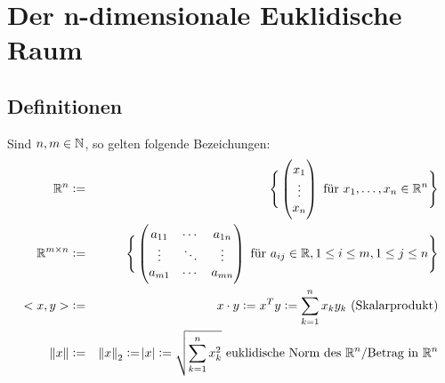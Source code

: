 \section{Der n-dimensionale Euklidische Raum}

\subsection{Definitionen}
Sind $n, m \in \mathbb{N}$, so gelten folgende Bezeichungen:
\begin{eqnarray*}
    \mathbb{R}^n &:=& \Bigg\{
        \begin{pmatrix}
            x_1\\
            \vdots \\
            x_n
        \end{pmatrix}
        \text{ für }
        x_1, \ldots, x_n \in \mathbb{R}^n
    \Bigg\} \\
    \mathbb{R}^{m \times n} &:=& \Bigg\{
        \begin{pmatrix}
            a_{11} & \cdots & a_{1n}\\
            \vdots & \ddots & \vdots \\
            a_{m1} & \cdots & a_{mn}
        \end{pmatrix}
        \text{ für }
        a_{ij} \in \mathbb{R}, 1 \leq i \leq m, 1 \leq j \leq n
    \Bigg\}\\
    <x, y> &:=& x \cdot y := x^T y := \sum_{k=1}^n x_k y_k \text{ (Skalarprodukt)}\\
    \norm{x} &:=& {\Vert x \Vert}_2 := \abs{x} := \sqrt{\sum_{k=1}^n x_k^2}
    \text{ euklidische Norm des }\mathbb{R}^n\text{/Betrag in }\mathbb{R}^n
\end{eqnarray*}

